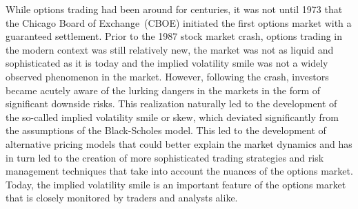 While options trading had been around for centuries, it was not until 1973 that the Chicago Board of Exchange~(CBOE) initiated the first options market with a guaranteed settlement. Prior to the 1987 stock market crash, options trading in the modern context was still relatively new, the market was not as liquid and sophisticated as it is today and the implied volatility smile was not a widely observed phenomenon in the market. However, following the crash, investors became acutely aware of the lurking dangers in the markets in the form of significant downside risks. This realization naturally led to the development of the so-called implied volatility smile or skew, which deviated significantly from the assumptions of the Black-Scholes model.
This led to the development of alternative pricing models that could better explain the market dynamics and has in turn led to the creation of more sophisticated trading strategies and risk management techniques that take into account the nuances of the options market. Today, the implied volatility smile is an important feature of the options market that is closely monitored by traders and analysts alike.

